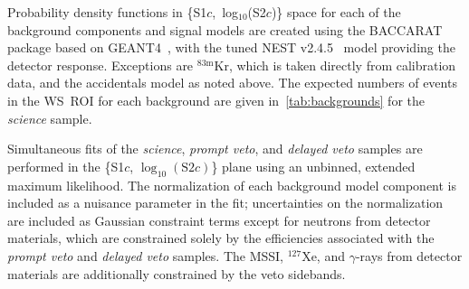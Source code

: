  

Probability density functions in \{S1$c$,~log$_{10}$(S2$c$)\} space for each of the background components and signal models are created using the BACCARAT package based on GEANT4~\cite{LZ:simulations_2021, GEANT4:2002zbu, ALLISON2016, Allison:2006ve}, with the tuned NEST v2.4.5~\cite{NEST:paper_2023} model providing the detector response. 
Exceptions are $^{83\text{m}}$Kr, which is taken directly from calibration data, and the accidentals model as noted above. 
The expected numbers of events in the WS~ROI for each background are given in~\autoref{tab:backgrounds} for the \emph{science} sample.

Simultaneous fits of the \emph{science}, \emph{prompt veto}, and \emph{delayed veto} samples 
are performed in the  \{S1$c$, $\log_{10}(\mathrm{S}2c)$\} plane using an unbinned, extended maximum likelihood. 
The normalization of each background model component is included as a nuisance parameter in the fit; uncertainties on the normalization are included as Gaussian constraint terms except for neutrons from detector materials, which
are constrained solely by the efficiencies associated with the \emph{prompt veto} and \emph{delayed veto} samples.
The MSSI, $^{127}$Xe, and $\gamma$-rays from detector materials are additionally constrained by the veto sidebands.

